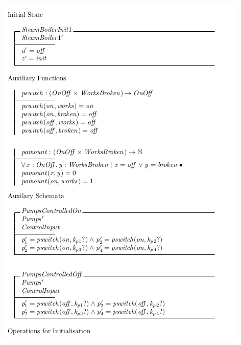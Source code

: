 \begin{center}
    \noindent \includegraphics[scale=0.8]{examples/steamboiler/0e.png}
\end{center}

